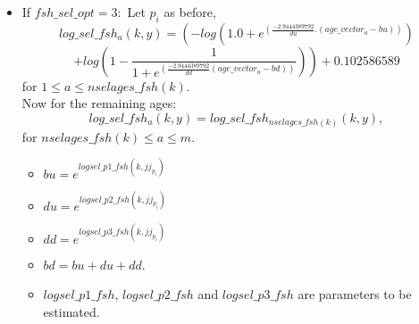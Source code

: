 \documentclass{article}
\begin{document}
\begin{itemize}
        
\item If $fsh\_sel\_opt=3:$ Let $p_i$ as before,
 \begin{equation}
        log\_sel\_fsh_a(k,y)     = \left( -log(1.0 + e^{(\frac{-2.9444389792}{du}.( age\_vector_a - bu) )}) \right.
    \end{equation}
    \begin{equation*}
         \left.+log\left(1 - \dfrac{1}{1 + e^{\left(\frac{-2.9444389792}{dd} ( age\_vector_a - bd)\right)}} \right) \right)+0.102586589 
    \end{equation*}
      for $1\leq a \leq nselages\_fsh(k)$.\\
      Now for the remaining ages:
    \begin{equation}
        log\_sel\_fsh_a(k,y) = log\_sel\_fsh_{nselages\_fsh(k)}(k,y),
    \end{equation}
    for $nselages\_fsh(k)\leq a \leq m$.
    \begin{itemize}
        \item %
        $bu = e^{logsel\_p1\_fsh(k,jj_{p_i})}$
        \item 
        $du = e^{logsel\_p2\_fsh(k,jj_{p_i})}$
        \item
        $dd = e^{logsel\_p3\_fsh(k,jj_{p_i})}$
        \item $bd = bu + du + dd$.
        \item $logsel\_p1\_fsh$, $logsel\_p2\_fsh$ and $logsel\_p3\_fsh$ are parameters to be estimated.
    \end{itemize}
    
    \end{itemize}
\end{document}

